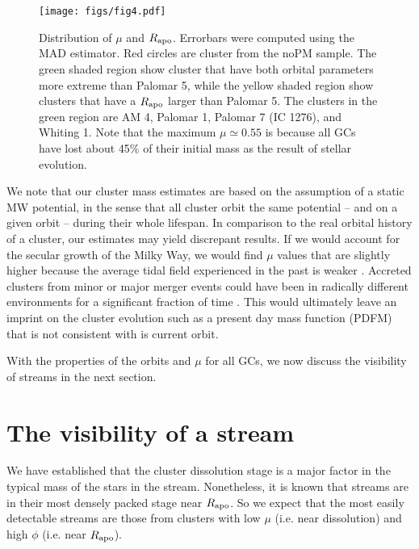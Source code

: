 \documentclass[useAMS,usenatbib,fleqn]{mnras}
\newcommand{\rapo}{R_{\rm apo}}
\begin{document}
\begin{figure}
\centering
\texttt{[image: figs/fig4.pdf]}
    \caption{Distribution of $\mu$ and $\rapo$. Errorbars were computed using
    the MAD estimator. Red circles are cluster  from the noPM sample. The
    green shaded region show cluster that have both orbital parameters more
    extreme than Palomar 5, while the yellow shaded region show clusters that
    have a $\rapo$ larger than Palomar 5. The clusters in the green region are
    AM 4, Palomar 1, Palomar 7 (IC 1276), and Whiting 1. Note that the maximum
    $\mu\simeq0.55$ is because all GCs have lost about 45\% of their initial
    mass as the result of stellar evolution.}
\label{fig:mu}
\end{figure}


We note that our cluster mass estimates are based on the assumption of a static
MW potential, in the sense that all cluster orbit the same potential -- and on a
given orbit -- during their whole lifespan. In comparison to the real orbital
history of a cluster, our estimates may yield discrepant results. If we would
account for the secular growth of the Milky Way, we would find $\mu$ values that
are slightly higher because the average tidal field experienced in the past is
weaker \citep{Renaud15}. Accreted clusters from minor or major merger events
could have been in radically different environments for a significant fraction
of time \citep*{Renaud17}. This would ultimately leave an imprint on the cluster
evolution such as a present day mass function (PDFM) that is not consistent with
is current orbit.

With the  properties of the orbits and $\mu$ for all GCs, we now discuss the
visibility of streams in the next section. 


\section{The visibility of a stream}
\label{sec:visibility}

We have established that the cluster dissolution stage is a major factor in the
typical mass of the stars in the stream. Nonetheless, it is known that streams
are in their most densely packed stage near $\rapo$. So we expect that the most
easily detectable streams are those from clusters with low $\mu$ (i.e. near
dissolution) and high $\phi$ (i.e. near $\rapo$).
\end{document}
